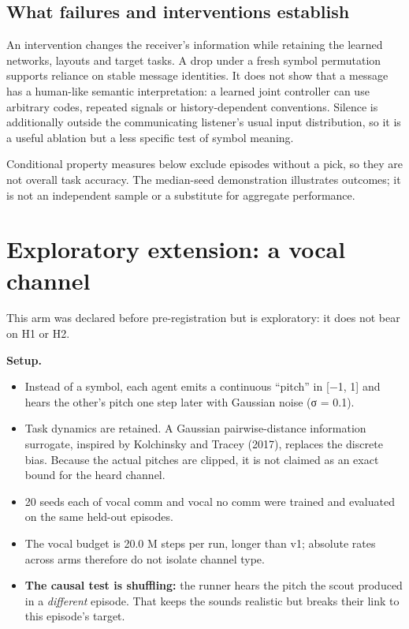 \subsection{What failures and interventions
establish}\label{what-failures-and-interventions-establish}

An intervention changes the receiver's information while retaining the
learned networks, layouts and target tasks. A drop under a fresh symbol
permutation supports reliance on stable message identities. It does not
show that a message has a human-like semantic interpretation: a learned
joint controller can use arbitrary codes, repeated signals or
history-dependent conventions. Silence is additionally outside the
communicating listener's usual input distribution, so it is a useful
ablation but a less specific test of symbol meaning.

Conditional property measures below exclude episodes without a pick, so
they are not overall task accuracy. The median-seed demonstration
illustrates outcomes; it is not an independent sample or a substitute
for aggregate performance.

\section{Exploratory extension: a vocal
channel}\label{exploratory-extension-a-vocal-channel}

This arm was declared before pre-registration but is exploratory: it
does not bear on H1 or H2.

\textbf{Setup.}

\begin{itemize}
\tightlist
\item
  Instead of a symbol, each agent emits a continuous ``pitch'' in {[}−1,
  1{]} and hears the other's pitch one step later with Gaussian noise (σ
  = 0.1).
\item
  Task dynamics are retained. A Gaussian pairwise-distance information
  surrogate, inspired by Kolchinsky and Tracey (2017), replaces the
  discrete bias. Because the actual pitches are clipped, it is not
  claimed as an exact bound for the heard channel.
\item
  20 seeds each of vocal comm and vocal no comm were trained and
  evaluated on the same held-out episodes.
\item
  The vocal budget is 20.0 M steps per run, longer than v1; absolute
  rates across arms therefore do not isolate channel type.
\item
  \textbf{The causal test is shuffling:} the runner hears the pitch the
  scout produced in a \emph{different} episode. That keeps the sounds
  realistic but breaks their link to this episode's target.
\end{itemize}

